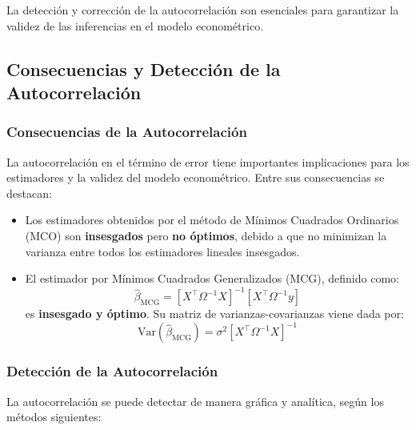 \documentclass[a4paper,12pt]{article}
\begin{document}
La detección y corrección de la autocorrelación son esenciales para garantizar la validez de las inferencias en el modelo econométrico.

\subsection{Consecuencias y Detección de la Autocorrelación}

\subsubsection{Consecuencias de la Autocorrelación}

La autocorrelación en el término de error tiene importantes implicaciones para los estimadores y la validez del modelo econométrico. Entre sus consecuencias se destacan:

\begin{itemize}
    \item Los estimadores obtenidos por el método de Mínimos Cuadrados Ordinarios (MCO) son \textbf{insesgados} pero \textbf{no óptimos}, debido a que no minimizan la varianza entre todos los estimadores lineales insesgados.
    \item El estimador por Mínimos Cuadrados Generalizados (MCG), definido como:
    \[
    \hat{\beta}_{\text{MCG}} = [X^\top \Omega^{-1} X]^{-1} [X^\top \Omega^{-1} y]
    \]
    es \textbf{insesgado y óptimo}. Su matriz de varianzas-covarianzas viene dada por:
    \[
    \text{Var}(\hat{\beta}_{\text{MCG}}) = \sigma^2 [X^\top \Omega^{-1} X]^{-1}
    \]
\end{itemize}

\subsubsection{Detección de la Autocorrelación}

La autocorrelación se puede detectar de manera gráfica y analítica, según los métodos siguientes:
\end{document}
